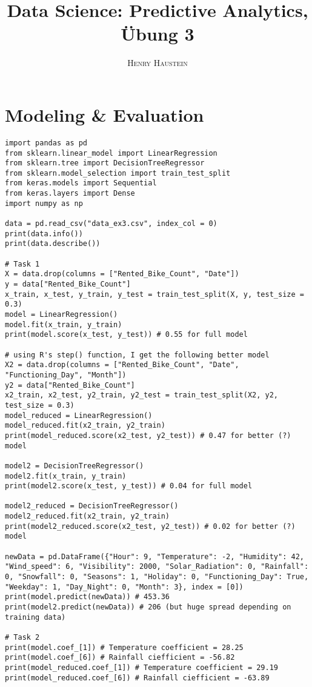\documentclass{article}
\title{\textbf{Data Science: Predictive Analytics, Übung 3}}
\author{\textsc{Henry Haustein}}
\date{}
\begin{document}
	\maketitle

	\section*{Modeling \& Evaluation}
	\begin{lstlisting}[tabsize=2]
import pandas as pd
from sklearn.linear_model import LinearRegression
from sklearn.tree import DecisionTreeRegressor
from sklearn.model_selection import train_test_split
from keras.models import Sequential
from keras.layers import Dense
import numpy as np

data = pd.read_csv("data_ex3.csv", index_col = 0)
print(data.info())
print(data.describe())

# Task 1
X = data.drop(columns = ["Rented_Bike_Count", "Date"])
y = data["Rented_Bike_Count"]
x_train, x_test, y_train, y_test = train_test_split(X, y, test_size = 0.3)
model = LinearRegression()
model.fit(x_train, y_train)
print(model.score(x_test, y_test)) # 0.55 for full model

# using R's step() function, I get the following better model
X2 = data.drop(columns = ["Rented_Bike_Count", "Date", "Functioning_Day", "Month"])
y2 = data["Rented_Bike_Count"]
x2_train, x2_test, y2_train, y2_test = train_test_split(X2, y2, test_size = 0.3)
model_reduced = LinearRegression()
model_reduced.fit(x2_train, y2_train)
print(model_reduced.score(x2_test, y2_test)) # 0.47 for better (?) model

model2 = DecisionTreeRegressor()
model2.fit(x_train, y_train)
print(model2.score(x_test, y_test)) # 0.04 for full model

model2_reduced = DecisionTreeRegressor()
model2_reduced.fit(x2_train, y2_train)
print(model2_reduced.score(x2_test, y2_test)) # 0.02 for better (?) model

newData = pd.DataFrame({"Hour": 9, "Temperature": -2, "Humidity": 42, "Wind_speed": 6, "Visibility": 2000, "Solar_Radiation": 0, "Rainfall": 0, "Snowfall": 0, "Seasons": 1, "Holiday": 0, "Functioning_Day": True, "Weekday": 1, "Day_Night": 0, "Month": 3}, index = [0])
print(model.predict(newData)) # 453.36
print(model2.predict(newData)) # 206 (but huge spread depending on training data)

# Task 2
print(model.coef_[1]) # Temperature coefficient = 28.25
print(model.coef_[6]) # Rainfall ciefficient = -56.82
print(model_reduced.coef_[1]) # Temperature coefficient = 29.19
print(model_reduced.coef_[6]) # Rainfall ciefficient = -63.89


\end{lstlisting}
\end{document}
